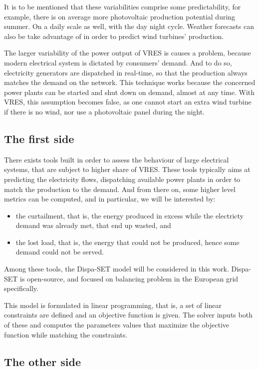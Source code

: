 It is to be mentioned that these variabilities comprise some predictability, for example, there is on average more photovoltaic production potential during summer. On a daily scale as well, with the day night cycle. Weather forecasts can also be take advantage of in order to predict wind turbines' production.

The larger variability of the power output of VRES is causes a problem, because modern electrical system is dictated by consumers' demand. And to do so, electricity generators are dispatched in real-time, so that the production always matches the demand on the network. This technique works because the concerned power plants can be started and shut down on demand, almost at any time. With VRES, this assumption becomes false, as one cannot start an extra wind turbine if there is no wind, nor use a photovoltaic panel during the night.

\subsection{The first side}

There exists tools built in order to assess the behaviour of large electrical systems, that are subject to higher share of VRES. These tools typically aims at predicting the electricity flows, dispatching available power plants in order to match the production to the demand. And from there on, some higher level metrics can be computed, and in particular, we will be interested by:
\begin{itemize}
    \item the curtailment, that is, the energy produced in excess while the electricty demand was already met, that end up wasted, and
    \item the lost load, that is, the energy that could not be produced, hence some demand could not be served.
\end{itemize}

Among these tools, the Dispa-SET model will be considered in this work. Dispa-SET is open-source, and focused on balancing problem in the European grid specifically.

This model is formulated in linear programming, that is, a set of linear constraints are defined and an objective function is given. The solver inputs both of these and computes the parameters values that maximize the objective function while matching the constraints.

\subsection{The other side}

